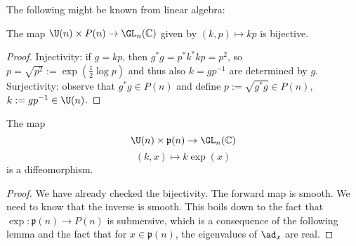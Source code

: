 \documentclass[reqno]{amsart} 
\begin{document}
The following might be known from linear algebra:
\begin{lemma}
  The map $\U(n) \times P(n) \rightarrow \GL_n(\mathbb{C})$ given by $(k,p) \mapsto k p$ is bijective.
\end{lemma}
\begin{proof}
  Injectivity: if $g = k p$, then $g^* g = p^* k^* k p = p^2$, so $p = \sqrt{p^2} := \exp(\tfrac{1}{2} \log p)$ and thus also $k = g p^{-1}$ are determined by $g$.  Surjectivity: observe that $g^* g \in P(n)$ and define $p := \sqrt{g^* g} \in P(n)$, $k := g p^{-1} \in \U(n)$.
\end{proof}
\begin{lemma}\label{lem:polar-decomp}
  The map
  \begin{equation*}
    \U(n) \times \mathfrak{p}(n) \rightarrow \GL_n(\mathbb{C})
  \end{equation*}
  \begin{equation*}
    (k,x) \mapsto k \exp(x)
  \end{equation*}
  is a diffeomorphism.
\end{lemma}
\begin{proof}
  We have already checked the bijectivity.  The forward map is smooth.  We need to know that the inverse is smooth.  This boils down to the fact that $\exp : \mathfrak{p}(n) \rightarrow P(n)$ is submersive, which is a consequence of the following lemma and the fact that for $x \in \mathfrak{p}(n)$, the eigenvalues of $\ad_x$ are real.
\end{proof}
\end{document}
